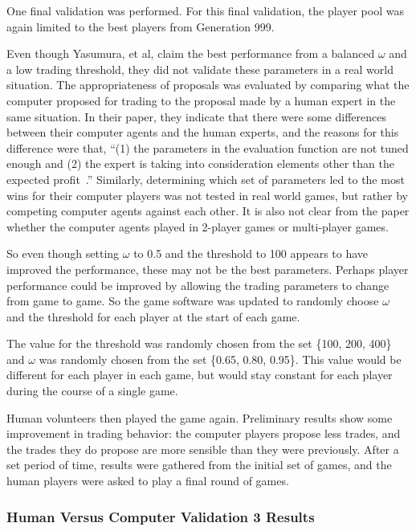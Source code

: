 One final validation was performed. For this final validation, the player pool
was again limited to the best players from Generation 999.

Even though Yasumura, et al, claim the best performance from a balanced
\(\omega\) and a low trading threshold, they did not validate these parameters
in a real world situation. The appropriateness of proposals was evaluated by
comparing what the computer proposed for trading to the proposal made by a human
expert in the same situation. In their paper, they indicate that there were some
differences between their computer agents and the human experts, and the reasons
for this difference were that, ``(1) the parameters in the evaluation function
are not tuned enough and (2) the expert is taking into consideration elements
other than the expected profit~\cite{Yasumura2001Negotiate}.'' Similarly,
determining which set of parameters led to the most wins for their computer
players was not tested in real world games, but rather by competing computer
agents against each other. It is also not clear from the paper whether the
computer agents played in 2-player games or multi-player games.

So even though setting \(\omega\) to 0.5 and the threshold to 100 appears to
have improved the performance, these may not be the best parameters. Perhaps
player performance could be improved by allowing the trading parameters to
change from game to game. So the game software was updated to randomly choose
\(\omega\) and the threshold for each player at the start of each game.

The value for the threshold was randomly chosen from the set \{100, 200,
400\} and \(\omega\) was randomly chosen from the set \{0.65, 0.80, 0.95\}. This
value would be different for each player in each game, but would stay constant
for each player during the course of a single game. 

Human volunteers then played the game again. Preliminary results show some
improvement in trading behavior: the computer players propose less trades, and
the trades they do propose are more sensible than they were previously. After a
set period of time, results were gathered from the initial set of games, and the
human players were asked to play a final round of games.

\subsubsection{Human Versus Computer Validation 3 Results}

